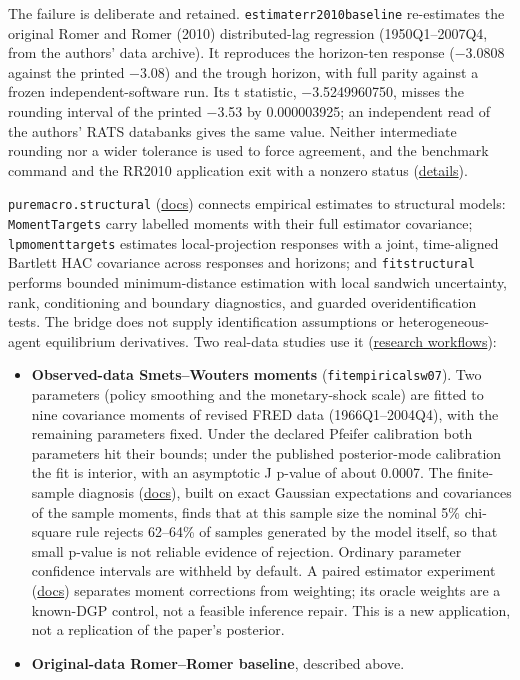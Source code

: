 \documentclass[11pt,letterpaper]{article}
\providecommand{\tightlist}{\setlength{\itemsep}{0pt}\setlength{\parskip}{0pt}}
\renewcommand{\_}{\pmunderscore\allowbreak}
\begin{document}
The failure is deliberate and retained. \texttt{estimate\_rr2010\_baseline} re-estimates the original Romer and Romer (2010) distributed-lag regression (1950Q1--2007Q4, from the authors' data archive). It reproduces the horizon-ten response (−3.0808 against the printed −3.08) and the trough horizon, with full parity against a frozen independent-software run. Its t statistic, −3.5249960750, misses the rounding interval of the printed −3.53 by 0.000003925; an independent read of the authors' RATS databanks gives the same value. Neither intermediate rounding nor a wider tolerance is used to force agreement, and the benchmark command and the RR2010 application exit with a nonzero status (\href{https://github.com/jalonso1979/puremacro/blob/v4.6.0/docs/empirical_research.md}{details}).

\texttt{puremacro.structural} (\href{https://github.com/jalonso1979/puremacro/blob/v4.6.0/docs/structural_bridge.md}{docs}) connects empirical estimates to structural models: \texttt{MomentTargets} carry labelled moments with their full estimator covariance; \texttt{lp\_moment\_targets} estimates local-projection responses with a joint, time-aligned Bartlett HAC covariance across responses and horizons; and \texttt{fit\_structural} performs bounded minimum-distance estimation with local sandwich uncertainty, rank, conditioning and boundary diagnostics, and guarded overidentification tests. The bridge does not supply identification assumptions or heterogeneous-agent equilibrium derivatives. Two real-data studies use it (\href{https://github.com/jalonso1979/puremacro/blob/v4.6.0/docs/research_workflows.md}{research workflows}):

\begin{itemize}
\tightlist
\item
  \textbf{Observed-data Smets--Wouters moments} (\texttt{fit\_empirical\_sw07}). Two parameters (policy smoothing and the monetary-shock scale) are fitted to nine covariance moments of revised FRED data (1966Q1--2004Q4), with the remaining parameters fixed. Under the declared Pfeifer calibration both parameters hit their bounds; under the published posterior-mode calibration the fit is interior, with an asymptotic J p-value of about 0.0007. The finite-sample diagnosis (\href{https://github.com/jalonso1979/puremacro/blob/v4.6.0/docs/sw07_finite_sample.md}{docs}), built on exact Gaussian expectations and covariances of the sample moments, finds that at this sample size the nominal 5\% chi-square rule rejects 62--64\% of samples generated by the model itself, so that small p-value is not reliable evidence of rejection. Ordinary parameter confidence intervals are withheld by default. A paired estimator experiment (\href{https://github.com/jalonso1979/puremacro/blob/v4.6.0/docs/sw07_estimator_experiment.md}{docs}) separates moment corrections from weighting; its oracle weights are a known-DGP control, not a feasible inference repair. This is a new application, not a replication of the paper's posterior.
\item
  \textbf{Original-data Romer--Romer baseline}, described above.
\end{itemize}
\end{document}
